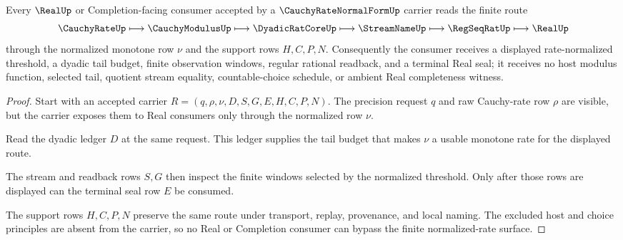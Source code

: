 \begin{theorem}
\label{thm:cauchy-rate-normal-form-real-seal}
Every $\RealUp$ or Completion-facing consumer accepted by a $\CauchyRateNormalFormUp$ carrier reads the finite route
$$
\CauchyRateUp \longmapsto \CauchyModulusUp \longmapsto \DyadicRatCoreUp \longmapsto \StreamNameUp \longmapsto \RegSeqRatUp \longmapsto \RealUp
$$
through the normalized monotone row $\nu$ and the support rows $H,C,P,N$. Consequently the consumer receives a displayed rate-normalized threshold, a dyadic tail budget, finite observation windows, regular rational readback, and a terminal Real seal; it receives no host modulus function, selected tail, quotient stream equality, countable-choice schedule, or ambient Real completeness witness.
\end{theorem}
\begin{proof}
Start with an accepted carrier $R=(q,\rho,\nu,D,S,G,E,H,C,P,N)$. The precision request $q$ and raw Cauchy-rate row $\rho$ are visible, but the carrier exposes them to Real consumers only through the normalized row $\nu$.

Read the dyadic ledger $D$ at the same request. This ledger supplies the tail budget that makes $\nu$ a usable monotone rate for the displayed route.

The stream and readback rows $S,G$ then inspect the finite windows selected by the normalized threshold. Only after those rows are displayed can the terminal seal row $E$ be consumed.

The support rows $H,C,P,N$ preserve the same route under transport, replay, provenance, and local naming. The excluded host and choice principles are absent from the carrier, so no Real or Completion consumer can bypass the finite normalized-rate surface.
\end{proof}


\begin{closurestatus}{\CauchyRateNormalFormUp}
  \theoryclosure{\seedClosure}
  \formalstatus{\unformalizedV}
\end{closurestatus}
